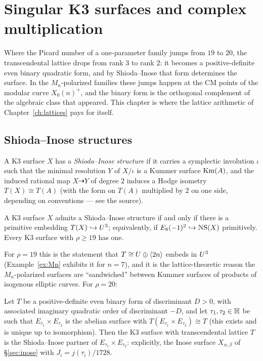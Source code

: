 \chapter{Singular K3 surfaces and complex multiplication}\label{ch:singular}

Where the Picard number of a one-parameter family jumps from $19$ to $20$, the
transcendental lattice drops from rank $3$ to rank $2$: it becomes a
positive-definite even binary quadratic form, and by Shioda--Inose that form
determines the surface. In the $M_n$-polarized families these jumps happen at
the CM points of the modular curve $X_0(n)^+$, and the binary form is the
orthogonal complement of the algebraic class that appeared. This chapter is
where the lattice arithmetic of Chapter~\ref{ch:lattices} pays for itself.

\section{Shioda--Inose structures}

\begin{definition}
A K3 surface $X$ has a \emph{Shioda--Inose structure} if it carries a
symplectic involution $\iota$ such that the minimal resolution $Y$ of
$X/\iota$ is a Kummer surface $\operatorname{Km}(A)$, and the induced rational map
$X\dashrightarrow Y$ of degree $2$ induces a Hodge isometry
$T(X)\cong T(A)$ (with the form on $T(A)$ multiplied by $2$ on one side,
depending on conventions --- see the source).
\end{definition}

\begin{theorem}
A K3 surface $X$ admits a Shioda--Inose structure if and only if there is a
primitive embedding $T(X)\hookrightarrow U^3$; equivalently, if
$E_8(-1)^2\hookrightarrow\operatorname{NS}(X)$ primitively. Every K3 surface with
$\rho\ge19$ has one.
\end{theorem}

For $\rho=19$ this is the statement that $T\cong U\oplus\langle 2n\rangle$ embeds in
$U^3$ (Example~\ref{ex:Mn} exhibits it for $n=7$), and it is the
lattice-theoretic reason the $M_n$-polarized surfaces are ``sandwiched'' between
Kummer surfaces of products of isogenous elliptic curves. For $\rho=20$:

\begin{theorem}\label{thm:SI-construction}
Let $T$ be a positive-definite even binary form of discriminant $D>0$, with
associated imaginary quadratic order of discriminant $-D$, and let
$\tau_1,\tau_2\in\mathbb{H}$ be such that $E_{\tau_1}\times E_{\tau_2}$ is the abelian
surface with $T(E_{\tau_1}\times E_{\tau_2})\cong T$ (this exists and is unique
up to isomorphism). Then the K3 surface with transcendental lattice $T$ is
the Shioda--Inose partner of $E_{\tau_1}\times E_{\tau_2}$: explicitly, the
Inose surface $X_{\alpha,\beta}$ of \S\ref{sec:inose} with $J_i=j(\tau_i)/1728$.
\end{theorem}

